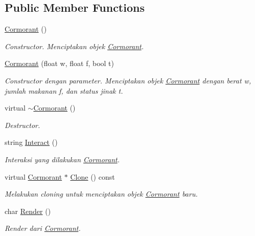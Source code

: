 \subsection*{Public Member Functions}
\begin{DoxyCompactItemize}
\item 
\hyperlink{classCormorant_a1c93b60af03db473c444783df366a2ae}{Cormorant} ()
\begin{DoxyCompactList}\small\item\em Constructor. Menciptakan objek \hyperlink{classCormorant}{Cormorant}. \end{DoxyCompactList}\item 
\hyperlink{classCormorant_a2a5c3053f29cb6c26f446ccc0982091b}{Cormorant} (float w, float f, bool t)
\begin{DoxyCompactList}\small\item\em Constructor dengan parameter. Menciptakan objek \hyperlink{classCormorant}{Cormorant} dengan berat w, jumlah makanan f, dan status jinak t. \end{DoxyCompactList}\item 
virtual \hyperlink{classCormorant_af24217c3b840dcf95b0961d68a241034}{$\sim$\+Cormorant} ()
\begin{DoxyCompactList}\small\item\em Destructor. \end{DoxyCompactList}\item 
string \hyperlink{classCormorant_af28984652ae999452d20aed885f0185a}{Interact} ()
\begin{DoxyCompactList}\small\item\em Interaksi yang dilakukan \hyperlink{classCormorant}{Cormorant}. \end{DoxyCompactList}\item 
virtual \hyperlink{classCormorant}{Cormorant} $\ast$ \hyperlink{classCormorant_a7be371562fab8ab5c2e9e72386ee9aa2}{Clone} () const 
\begin{DoxyCompactList}\small\item\em Melakukan cloning untuk menciptakan objek \hyperlink{classCormorant}{Cormorant} baru. \end{DoxyCompactList}\item 
char \hyperlink{classCormorant_a6d388885acfc98de6020a01b90259dac}{Render} ()
\begin{DoxyCompactList}\small\item\em Render dari \hyperlink{classCormorant}{Cormorant}. \end{DoxyCompactList}\end{DoxyCompactItemize}
